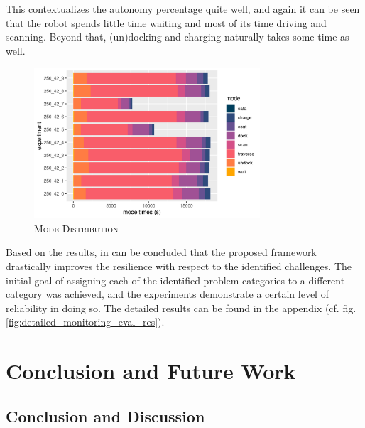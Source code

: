 \documentclass[english, master, utf8]{base/thesis_KBS}
\begin{document}
This contextualizes the autonomy percentage quite well, and again it can be seen that the robot spends little time waiting and most of its time driving and scanning.
Beyond that, (un)docking and charging naturally takes some time as well.
\begin{figure}[H]
    \centering
    \includegraphics[width=0.75\textwidth]{pics/mode_times.png}
    \caption{\textsc{Mode Distribution}}
    \label{fig:mode_times}
\end{figure}
Based on the results, in can be concluded that the proposed framework drastically improves the resilience with respect to the identified challenges. The initial goal of assigning each
of the identified problem categories to a different category was achieved, and the experiments demonstrate a certain level of reliability in doing so. The detailed results can be
found in the appendix (cf. fig. \ref{fig:detailed_monitoring_eval_res}).

\vfill
\pagebreak

\chapter{Conclusion and Future Work}
\label{sec:conclusion_future_work}

\section{Conclusion and Discussion}
\end{document}
